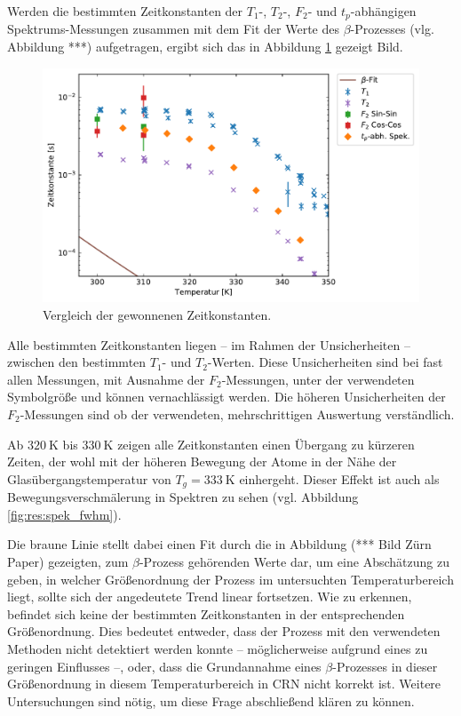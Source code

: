 Werden die bestimmten Zeitkonstanten der $T_1$-, $T_2$-, $F_2$- und $t_p$-abhängigen Spektrums-Messungen zusammen mit dem Fit der Werte des $\beta$-Prozesses (vlg. Abbildung ***) aufgetragen, ergibt sich das in Abbildung \ref{fig:res:dynvgl} gezeigt Bild.
\begin{figure}
	\begin{center}
		\includegraphics[width=.9\textwidth]{graphics/plot/dyn.pdf}
	\end{center}
	\caption{Vergleich der gewonnenen Zeitkonstanten.} \label{fig:res:dynvgl}
\end{figure}
Alle bestimmten Zeitkonstanten liegen -- im Rahmen der Unsicherheiten -- zwischen den bestimmten $T_1$- und $T_2$-Werten. Diese Unsicherheiten sind bei fast allen Messungen, mit Ausnahme der $F_2$-Messungen, unter der verwendeten Symbolgröße und können vernachlässigt werden. Die höheren Unsicherheiten der $F_2$-Messungen sind ob der verwendeten, mehrschrittigen Auswertung verständlich.

Ab $\SI{320}{\kelvin}$ bis $\SI{330}{\kelvin}$ zeigen alle Zeitkonstanten einen Übergang zu kürzeren Zeiten, der wohl mit der höheren Bewegung der Atome in der Nähe der Glasübergangstemperatur von $T_g = \SI{333}{\kelvin}$ einhergeht. Dieser Effekt ist auch als Bewegungsverschmälerung in Spektren zu sehen (vgl. Abbildung \ref{fig:res:spek_fwhm}).

Die braune Linie stellt dabei einen Fit durch die in Abbildung (*** Bild Zürn Paper) gezeigten, zum $\beta$-Prozess gehörenden Werte dar, um eine Abschätzung zu geben, in welcher Größenordnung der Prozess im untersuchten Temperaturbereich liegt, sollte sich der angedeutete Trend linear fortsetzen. Wie zu erkennen, befindet sich keine der bestimmten Zeitkonstanten in der entsprechenden Größenordnung. Dies bedeutet entweder, dass der Prozess mit den verwendeten Methoden nicht detektiert werden konnte -- möglicherweise aufgrund eines zu geringen Einflusses --, oder, dass die Grundannahme eines $\beta$-Prozesses in dieser Größenordnung in diesem Temperaturbereich in CRN nicht korrekt ist. Weitere Untersuchungen sind nötig, um diese Frage abschließend klären zu können.



